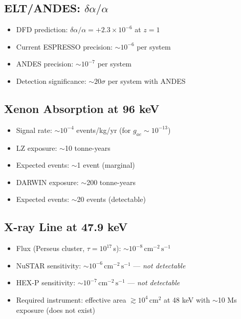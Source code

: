 \documentclass[12pt,a4paper]{article}
\newcommand{\cms}{\,\mathrm{cm}^{-2}\,\mathrm{s}^{-1}}
\begin{document}
\subsection{ELT/ANDES: $\delta\alpha/\alpha$}

\begin{itemize}
\item DFD prediction: $\delta\alpha/\alpha = +2.3 \times 10^{-6}$ at $z = 1$
\item Current ESPRESSO precision: $\sim 10^{-6}$ per system
\item ANDES precision: $\sim 10^{-7}$ per system
\item Detection significance: $\sim 20\sigma$ per system with ANDES
\end{itemize}

\subsection{Xenon Absorption at 96 keV}

\begin{itemize}
\item Signal rate: $\sim 10^{-4}$ events/kg/yr
(for $g_{ae} \sim 10^{-13}$)
\item LZ exposure: $\sim$10 tonne-years
\item Expected events: $\sim$1 event (marginal)
\item DARWIN exposure: $\sim$200 tonne-years
\item Expected events: $\sim$20 events (detectable)
\end{itemize}

\subsection{X-ray Line at 47.9 keV}

\begin{itemize}
\item Flux (Perseus cluster, $\tau = 10^{17}$\,s): $\sim 10^{-8}\cms$
\item NuSTAR sensitivity: $\sim 10^{-6}\cms$ --- \emph{not detectable}
\item HEX-P sensitivity: $\sim 10^{-7}\cms$ --- \emph{not detectable}
\item Required instrument: effective area $\gtrsim 10^4$\,cm$^2$ at
48 keV with $\sim$10 Ms exposure (does not exist)
\end{itemize}

\end{document}
